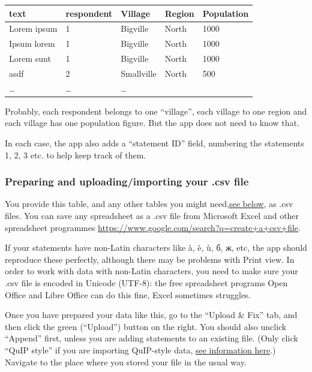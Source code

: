\documentclass[
]{book}
\begin{document}
\begin{longtable}[]{@{}lllll@{}}
\toprule
\textbf{text} & \textbf{respondent} & \textbf{Village} & \textbf{Region} & \textbf{Population} \\
\midrule
\endhead
Lorem ipsum & 1 & Bigville & North & 1000 \\
Ipsum lorem & 1 & Bigville & North & 1000 \\
Lorem sunt & 1 & Bigville & North & 1000 \\
asdf & 2 & Smallville & North & 500 \\
\ldots{} & \ldots{} & \ldots{} & & \\
\bottomrule
\end{longtable}

Probably, each respondent belongs to one ``village'', each village to one region and each village has one population figure. But the app does not need to know that.

In each case, the app also adds a ``statement ID'' field, numbering the statements 1, 2, 3 etc. to help keep track of them.

\hypertarget{preparing-and-uploadingimporting-your-.csv-file}{%
\subsubsection{Preparing and uploading/importing your .csv file}\label{preparing-and-uploadingimporting-your-.csv-file}}

You provide this table, and any other tables you might need,\protect\hyperlink{viewing-and-manually-editing-your-data}{see below}, as .csv files. You can save any spreadsheet as a .csv file from Microsoft Excel and other spreadsheet programmes \url{https://www.google.com/search?q=create+a+csv+file}.

If your statements have non-Latin characters like à, è, ù, б, ж, etc, the app should reproduce these perfectly, although there may be problems with Print view. In order to work with data with non-Latin characters, you need to make sure your .csv file is encoded in Unicode (UTF-8): the free spreadsheet programs Open Office and Libre Office can do this fine, Excel sometimes struggles.

Once you have prepared your data like this, go to the ``Upload \& Fix'' tab, and then click the green (``Upload'') button on the right. You should also unclick ``Append'' first, unless you are adding statements to an existing file. (Only click ``QuIP style'' if you are importing QuIP-style data, \protect\hyperlink{quip-specific-importing-from-a-quip-spreadsheet}{see information here}.) Navigate to the place where you stored your file in the usual way.
\end{document}
